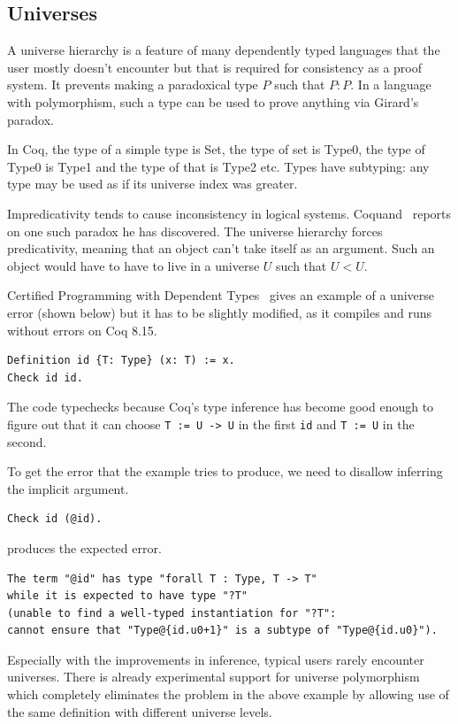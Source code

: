 \documentclass[english, 12pt, a4paper, sci, a-1b, online]{aaltothesis}
\newcommand\icoq[1]{\texttt{#1}}
\begin{document}
\subsection{Universes}

A universe hierarchy is a feature of many dependently typed languages that the user mostly doesn't encounter but that is required for consistency as a proof system. It prevents making a paradoxical type $P$ such that $P: P$. In a language with polymorphism, such a type can be used to prove anything via Girard's paradox.

In Coq, the type of a simple type is Set, the type of set is Type0, the type of Type0 is Type1 and the type of that is Type2 etc. Types have subtyping: any type may be used as if its universe index was greater.~\cite{CPDT}

Impredicativity tends to cause inconsistency in logical systems. Coquand~\cite{newParadox} reports on one such paradox he has discovered. The universe hierarchy forces predicativity, meaning that an object can't take itself as an argument. Such an object would have to have to live in a universe $U$ such that $U < U$.

Certified Programming with Dependent Types~\cite{CPDT} gives an example of a universe error (shown below) but it has to be slightly modified, as it compiles and runs without errors on Coq 8.15.
\begin{verbatim}
Definition id {T: Type} (x: T) := x.
Check id id.
\end{verbatim}
The code typechecks because Coq's type inference has become good enough to figure out that it can choose \icoq{T := U -> U} in the first \icoq{id} and \icoq{T := U} in the second.

To get the error that the example tries to produce, we need to disallow inferring the implicit argument.
\begin{verbatim}
Check id (@id).
\end{verbatim}
produces the expected error.
\begin{verbatim}
The term "@id" has type "forall T : Type, T -> T"
while it is expected to have type "?T"
(unable to find a well-typed instantiation for "?T":
cannot ensure that "Type@{id.u0+1}" is a subtype of "Type@{id.u0}").
\end{verbatim}

Especially with the improvements in inference, typical users rarely encounter universes. There is already experimental support for universe polymorphism~\cite{coqRefman} which completely eliminates the problem in the above example by allowing use of the same definition with different universe levels.
\end{document}
